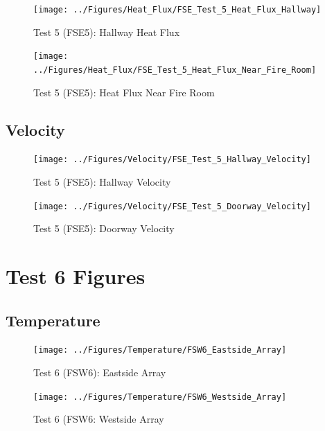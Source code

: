 \documentclass[12pt,oneside]{book}
\begin{document}
\begin{figure}[!ht]
	\texttt{[image: ../Figures/Heat\_Flux/FSE\_Test\_5\_Heat\_Flux\_Hallway]}
	\caption{Test 5 (FSE5): Hallway Heat Flux}
	\label{fig:Test_5_Hallway_Heat_Flux}
\end{figure}

\begin{figure}[!ht]
	\texttt{[image: ../Figures/Heat\_Flux/FSE\_Test\_5\_Heat\_Flux\_Near\_Fire\_Room]}
	\caption{Test 5 (FSE5): Heat Flux Near Fire Room}
	\label{fig:Test_5_Heat_Flux_Near_Fire_Room}
\end{figure}

\subsection{Velocity}
\label{subsec:Velocity}

\begin{figure}[!ht]
	\texttt{[image: ../Figures/Velocity/FSE\_Test\_5\_Hallway\_Velocity]}
	\caption{Test 5 (FSE5): Hallway Velocity}
	\label{fig:Test_5_Hallway_Velocity}
\end{figure}

\begin{figure}[!ht]
	\texttt{[image: ../Figures/Velocity/FSE\_Test\_5\_Doorway\_Velocity]}
	\caption{Test 5 (FSE5): Doorway Velocity}
	\label{fig:Test_5_Doorway_Velocity}
\end{figure}

\clearpage

\section{Test 6 Figures}
\label{subsec:Test_6_Figures}

\subsection{Temperature}
\label{subsec:Temperature}

\begin{figure}[!ht]
	\texttt{[image: ../Figures/Temperature/FSW6\_Eastside\_Array]}
	\caption{Test 6 (FSW6): Eastside Array}
	\label{fig:Test_6_Eastside_Array}
\end{figure}

\begin{figure}[!ht]
	\texttt{[image: ../Figures/Temperature/FSW6\_Westside\_Array]}
	\caption{Test 6 (FSW6: Westside Array}
	\label{fig:Test_6_Westside_Array}
\end{figure}
\end{document}

